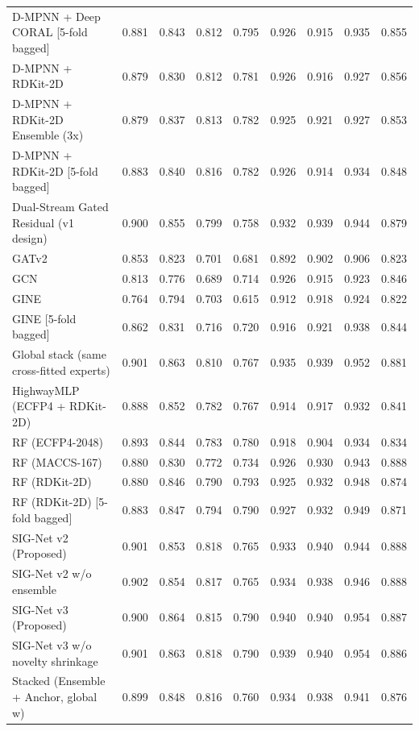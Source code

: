 \documentclass[11pt]{article}
\begin{document}
\begin{landscape}
{\begin{longtable}{lcccccccc}
D-MPNN + Deep CORAL [5-fold bagged] & 0.881 & 0.843 & 0.812 & 0.795 & 0.926 & 0.915 & 0.935 & 0.855 \\
D-MPNN + RDKit-2D & 0.879 & 0.830 & 0.812 & 0.781 & 0.926 & 0.916 & 0.927 & 0.856 \\
D-MPNN + RDKit-2D Ensemble (3x) & 0.879 & 0.837 & 0.813 & 0.782 & 0.925 & 0.921 & 0.927 & 0.853 \\
D-MPNN + RDKit-2D [5-fold bagged] & 0.883 & 0.840 & 0.816 & 0.782 & 0.926 & 0.914 & 0.934 & 0.848 \\
Dual-Stream Gated Residual (v1 design) & 0.900 & 0.855 & 0.799 & 0.758 & 0.932 & 0.939 & 0.944 & 0.879 \\
GATv2 & 0.853 & 0.823 & 0.701 & 0.681 & 0.892 & 0.902 & 0.906 & 0.823 \\
GCN & 0.813 & 0.776 & 0.689 & 0.714 & 0.926 & 0.915 & 0.923 & 0.846 \\
GINE & 0.764 & 0.794 & 0.703 & 0.615 & 0.912 & 0.918 & 0.924 & 0.822 \\
GINE [5-fold bagged] & 0.862 & 0.831 & 0.716 & 0.720 & 0.916 & 0.921 & 0.938 & 0.844 \\
Global stack (same cross-fitted experts) & 0.901 & 0.863 & 0.810 & 0.767 & 0.935 & 0.939 & 0.952 & 0.881 \\
HighwayMLP (ECFP4 + RDKit-2D) & 0.888 & 0.852 & 0.782 & 0.767 & 0.914 & 0.917 & 0.932 & 0.841 \\
RF (ECFP4-2048) & 0.893 & 0.844 & 0.783 & 0.780 & 0.918 & 0.904 & 0.934 & 0.834 \\
RF (MACCS-167) & 0.880 & 0.830 & 0.772 & 0.734 & 0.926 & 0.930 & 0.943 & 0.888 \\
RF (RDKit-2D) & 0.880 & 0.846 & 0.790 & 0.793 & 0.925 & 0.932 & 0.948 & 0.874 \\
RF (RDKit-2D) [5-fold bagged] & 0.883 & 0.847 & 0.794 & 0.790 & 0.927 & 0.932 & 0.949 & 0.871 \\
SIG-Net v2 (Proposed) & 0.901 & 0.853 & 0.818 & 0.765 & 0.933 & 0.940 & 0.944 & 0.888 \\
SIG-Net v2 w/o ensemble & 0.902 & 0.854 & 0.817 & 0.765 & 0.934 & 0.938 & 0.946 & 0.888 \\
SIG-Net v3 (Proposed) & 0.900 & 0.864 & 0.815 & 0.790 & 0.940 & 0.940 & 0.954 & 0.887 \\
SIG-Net v3 w/o novelty shrinkage & 0.901 & 0.863 & 0.818 & 0.790 & 0.939 & 0.940 & 0.954 & 0.886 \\
Stacked (Ensemble + Anchor, global w) & 0.899 & 0.848 & 0.816 & 0.760 & 0.934 & 0.938 & 0.941 & 0.876 \\

\end{longtable}}
\end{landscape}
\end{document}
